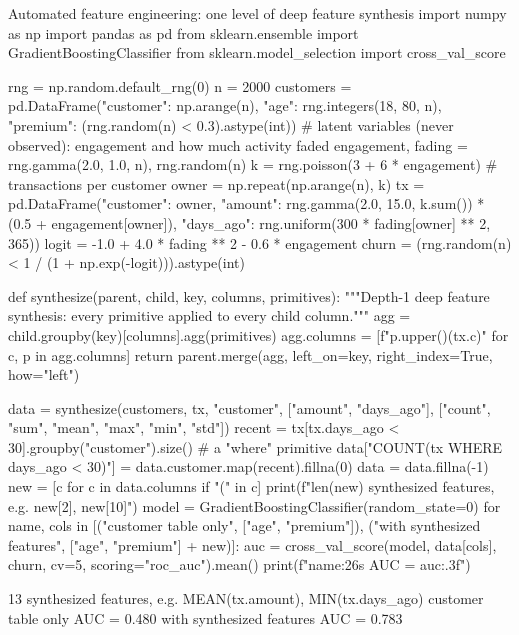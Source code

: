\begin{pylisting}[label={lst:dfs}]{Automated feature engineering: one level of deep feature synthesis}
import numpy as np
import pandas as pd
from sklearn.ensemble import GradientBoostingClassifier
from sklearn.model_selection import cross_val_score

rng = np.random.default_rng(0)
n = 2000
customers = pd.DataFrame({"customer": np.arange(n), "age": rng.integers(18, 80, n),
                          "premium": (rng.random(n) < 0.3).astype(int)})
# latent variables (never observed): engagement and how much activity faded
engagement, fading = rng.gamma(2.0, 1.0, n), rng.random(n)
k = rng.poisson(3 + 6 * engagement)                        # transactions per customer
owner = np.repeat(np.arange(n), k)
tx = pd.DataFrame({"customer": owner,
                   "amount": rng.gamma(2.0, 15.0, k.sum()) * (0.5 + engagement[owner]),
                   "days_ago": rng.uniform(300 * fading[owner] ** 2, 365)})
logit = -1.0 + 4.0 * fading ** 2 - 0.6 * engagement
churn = (rng.random(n) < 1 / (1 + np.exp(-logit))).astype(int)

def synthesize(parent, child, key, columns, primitives):
    """Depth-1 deep feature synthesis: every primitive applied to every child column."""
    agg = child.groupby(key)[columns].agg(primitives)
    agg.columns = [f"{p.upper()}(tx.{c})" for c, p in agg.columns]
    return parent.merge(agg, left_on=key, right_index=True, how="left")

data = synthesize(customers, tx, "customer", ["amount", "days_ago"],
                  ["count", "sum", "mean", "max", "min", "std"])
recent = tx[tx.days_ago < 30].groupby("customer").size()       # a "where" primitive
data["COUNT(tx WHERE days_ago < 30)"] = data.customer.map(recent).fillna(0)
data = data.fillna(-1)
new = [c for c in data.columns if "(" in c]
print(f"{len(new)} synthesized features, e.g. {new[2]}, {new[10]}")
model = GradientBoostingClassifier(random_state=0)
for name, cols in [("customer table only", ["age", "premium"]),
                   ("with synthesized features", ["age", "premium"] + new)]:
    auc = cross_val_score(model, data[cols], churn, cv=5, scoring="roc_auc").mean()
    print(f"{name:26s} AUC = {auc:.3f}")
\end{pylisting}
\begin{pyoutput}
13 synthesized features, e.g. MEAN(tx.amount), MIN(tx.days_ago)
customer table only        AUC = 0.480
with synthesized features  AUC = 0.783
\end{pyoutput}

